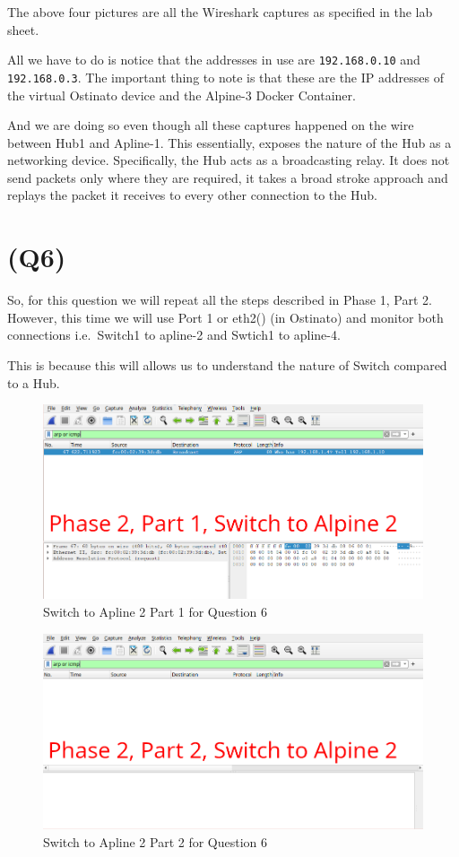 The above four pictures are all the Wireshark captures as specified in
the lab sheet.

All we have to do is notice that the addresses in use are
\texttt{192.168.0.10} and \texttt{192.168.0.3}. The important thing to
note is that these are the IP addresses of the virtual Ostinato device
and the Alpine-3 Docker Container.

And we are doing so even though all these captures happened on the wire
between Hub1 and Apline-1. This essentially, exposes the nature of the
Hub as a networking device. Specifically, the Hub acts as a broadcasting
relay. It does not send packets only where they are required, it takes a
broad stroke approach and replays the packet it receives to every other
connection to the Hub.

\hypertarget{q6}{%
\section{(Q6)}\label{q6}}

So, for this question we will repeat all the steps described in Phase 1,
Part 2. However, this time we will use Port 1 or eth2() (in Ostinato)
and monitor both connections i.e.~Switch1 to apline-2 and Swtich1 to
apline-4.

This is because this will allows us to understand the nature of Switch
compared to a Hub.

\begin{figure}
\centering
\includegraphics{data/q6-phase2-switch-to-alpine2-part1.png}
\caption{Switch to Apline 2 Part 1 for Question 6}
\end{figure}

\begin{figure}
\centering
\includegraphics{data/q6-phase2-switch-to-alpine2-part2.png}
\caption{Switch to Apline 2 Part 2 for Question 6}
\end{figure}


